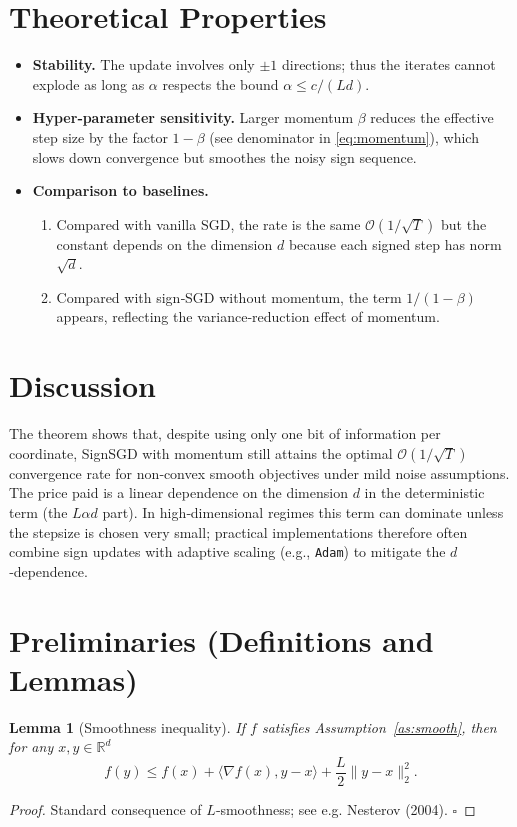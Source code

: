 \documentclass{article}
\newtheorem{lemma}{Lemma}[section]
\begin{document}
\section*{Theoretical Properties}
\begin{itemize}[leftmargin=*]
\item \textbf{Stability.} The update involves only $\pm1$ directions; thus the iterates cannot explode as long as $\alpha$ respects the bound $\alpha\le c/(Ld)$.
\item \textbf{Hyper‑parameter sensitivity.} Larger momentum $\beta$ reduces the effective step size by the factor $1-\beta$ (see denominator in \eqref{eq:momentum}), which slows down convergence but smoothes the noisy sign sequence.
\item \textbf{Comparison to baselines.}
    \begin{enumerate}
        \item Compared with vanilla SGD, the rate is the same $\mathcal{O}(1/\sqrt{T})$ but the constant depends on the dimension $d$ because each signed step has norm $\sqrt{d}$.
        \item Compared with sign‑SGD without momentum, the term $1/(1-\beta)$ appears, reflecting the variance‑reduction effect of momentum.
    \end{enumerate}
\end{itemize}

\section*{Discussion}
The theorem shows that, despite using only one bit of information per coordinate, SignSGD with momentum still attains the optimal $\mathcal{O}(1/\sqrt{T})$ convergence rate for non‑convex smooth objectives under mild noise assumptions. The price paid is a linear dependence on the dimension $d$ in the deterministic term (the $L\alpha d$ part). In high‑dimensional regimes this term can dominate unless the stepsize is chosen very small; practical implementations therefore often combine sign updates with adaptive scaling (e.g., \texttt{Adam}) to mitigate the $d$‑dependence.

\newpage
\section*{Preliminaries (Definitions and Lemmas)}
\begin{lemma}[Smoothness inequality]\label{lem:smooth}
If $f$ satisfies Assumption~\ref{as:smooth}, then for any $x,y\in\mathbb{R}^{d}$
\[
f(y)\le f(x)+\langle\nabla f(x),y-x\rangle+\frac{L}{2}\|y-x\|_{2}^{2}.
\]
\end{lemma}
\begin{proof}
Standard consequence of $L$‑smoothness; see e.g. Nesterov (2004). \hfill $\square$
\end{proof}
\end{document}
